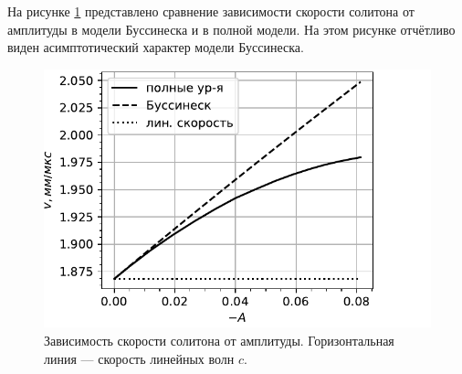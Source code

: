 \documentclass[12pt, a4paper]{article}
\begin{document}
На рисунке \ref{fig:sol_compare} представлено сравнение зависимости скорости солитона от амплитуды в модели Буссинеска и в полной модели. На этом рисунке отчётливо виден асимптотический характер модели Буссинеска.
\begin{figure}[h!]
	\centering
	\includegraphics[width=0.54\linewidth]{figures/VelAmplSmall}
	\vspace{-2mm}
	\caption{Зависимость скорости солитона от амплитуды. Горизонтальная линия --- скорость линейных волн $c$.}
	\label{fig:sol_compare}
	\vspace{-3mm}
\end{figure}


\end{document}
